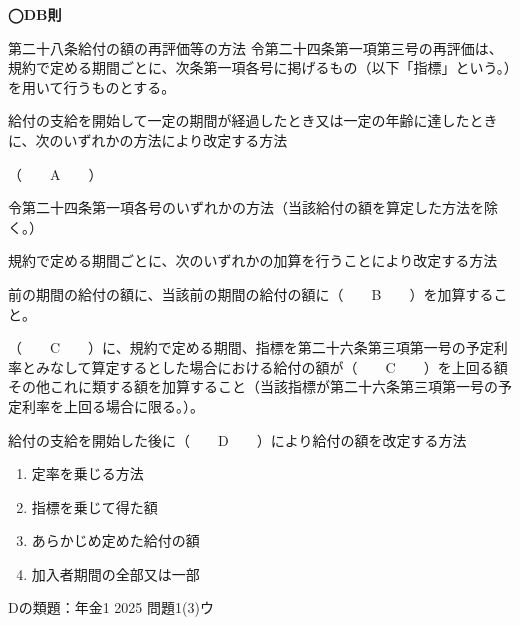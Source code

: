 \begin{fillblank}[数理人試験 2025 問題4 設問1]
  \noindent \textbf{◯DB則}
  \begin{lawstructure}
    \begin{lawarticle}{第二十八条}{給付の額の再評価等の方法}
      令第二十四条第一項第三号の再評価は、規約で定める期間ごとに、次条第一項各号に掲げるもの（以下「指標」という。）を用いて行うものとする。
      
      給付の支給を開始して一定の期間が経過したとき又は一定の年齢に達したときに、次のいずれかの方法により改定する方法

      （　　A　　）

      令第二十四条第一項各号のいずれかの方法（当該給付の額を算定した方法を除く。）

      規約で定める期間ごとに、次のいずれかの加算を行うことにより改定する方法

      前の期間の給付の額に、当該前の期間の給付の額に（　　B　　）を加算すること。

      （　　C　　）に、規約で定める期間、指標を第二十六条第三項第一号の予定利率とみなして算定するとした場合における給付の額が（　　C　　）を上回る額その他これに類する額を加算すること（当該指標が第二十六条第三項第一号の予定利率を上回る場合に限る。）。

      給付の支給を開始した後に（　　D　　）により給付の額を改定する方法

    \end{lawarticle}
  \end{lawstructure}  
\end{fillblank}

\begin{answerbox}
  \begin{enumerate}[A:]
    \item 定率を乗じる方法
    \item 指標を乗じて得た額
    \item あらかじめ定めた給付の額
    \item 加入者期間の全部又は一部
  \end{enumerate}
\end{answerbox}

\begin{explanationbox}
  Dの類題：年金1 2025 問題1(3)ウ
\end{explanationbox}


